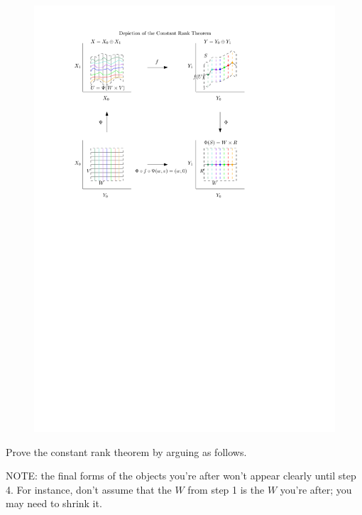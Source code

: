\documentclass[a4paper]{article}
\begin{document}
\begin{figure}[!ht]
  \centering
  \includegraphics[width=0.7\linewidth]{fig/constant_rank.pdf}
\end{figure}

Prove the constant rank theorem by arguing as follows.

NOTE: the final forms of the objects you're after won't 
appear clearly until step 4. For instance, don't assume 
that the $W$ from step 1 is the $W$ you're after; you 
may need to shrink it.
\end{document}
